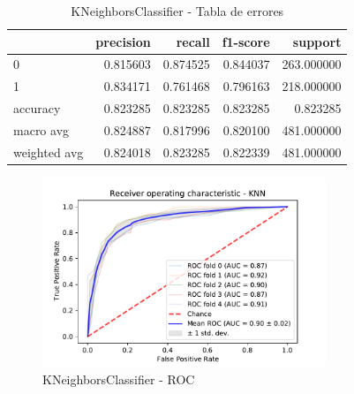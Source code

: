 \documentclass[12pt,twoside]{report}
\begin{document}
\begin{table}[htp]
\begin{center}
\begin{tabular}{lrrrr}
\toprule
{} &  precision &    recall &  f1-score &     support \\
\midrule
0            &   0.815603 &  0.874525 &  0.844037 &  263.000000 \\
1            &   0.834171 &  0.761468 &  0.796163 &  218.000000 \\
accuracy     &   0.823285 &  0.823285 &  0.823285 &    0.823285 \\
macro avg    &   0.824887 &  0.817996 &  0.820100 &  481.000000 \\
weighted avg &   0.824018 &  0.823285 &  0.822339 &  481.000000 \\
\bottomrule
\end{tabular}
\end{center}
\caption{KNeighborsClassifier - Tabla de errores}
\label{knn:precision}
\end{table}


\begin{figure}[htp]
\begin{center}
\includegraphics[width=8.5cm]{./code/figures_python/roc/knn.pdf}%
\end{center}
 \caption{KNeighborsClassifier - ROC}
 \label{knn:roc}
 \end{figure}
 
\end{document}
